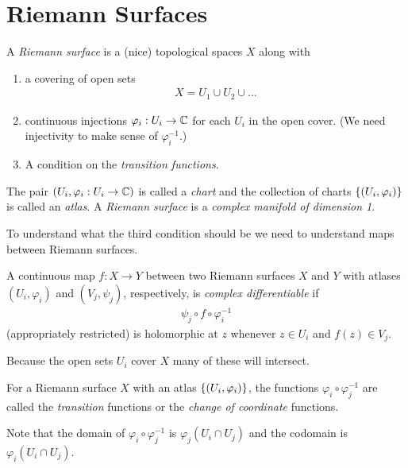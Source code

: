 \documentclass{article}
\begin{document}
\section{Riemann Surfaces}
\begin{definition}
  A \emph{Riemann surface} is a (nice) topological spaces $X$ along with
  \begin{enumerate}
    \item a covering of open sets
    \begin{align*}
      X = U_1 \cup U_2 \cup \dots
    \end{align*}
    \item continuous injections $\varphi_i: U_i \rightarrow \mathbb{C}$ for each $U_i$ in the open cover. (We need injectivity to make sense of $\varphi_i^{-1}$.)
    \item A condition on the \emph{transition functions}.
  \end{enumerate}
  The pair $(U_i, \varphi_i: U_i \rightarrow \mathbb{C})$ is called a \emph{chart} and the collection of charts $\left\{(U_i, \varphi_i)\right\}$ is called an \emph{atlas}.
  A \emph{Riemann surface} is a \emph{complex manifold of dimension 1}.
\end{definition}

To understand what the third condition should be we need to understand maps between Riemann surfaces.

\begin{definition}
  A continuous map $f:X \rightarrow Y$ between two Riemann surfaces $X$ and $Y$ with atlases $(U_i, \varphi_i)$ and $(V_j, \psi_j)$, respectively, is \emph{complex differentiable} if
  \begin{align*}
    \psi_j \circ f \circ \varphi_i^{-1}
  \end{align*}
  (appropriately restricted) is holomorphic at $z$ whenever $z \in U_i$ and $f(z) \in V_j$.
\end{definition}

Because the open sets $U_i$ cover $X$ many of these will intersect.
\begin{definition}
  For a Riemann surface $X$ with an atlas $\left\{(U_i, \varphi_i)\right\}$, the functions $\varphi_i \circ \varphi_j^{-1}$ are called the \emph{transition} functions or the \emph{change of coordinate} functions.
\end{definition}

Note that the domain of $\varphi_i \circ \varphi_j^{-1}$ is $\varphi_j(U_i \cap U_j)$ and the codomain is $\varphi_i(U_i \cap U_j)$.
\end{document}
